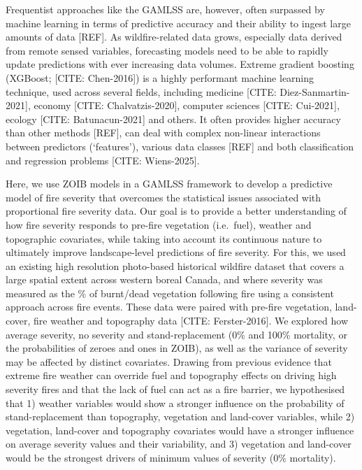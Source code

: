 \documentclass[
  numafflabel,
  authoryear,
  preprint]{elsarticle}
\begin{document}
Frequentist approaches like the GAMLSS are, however, often surpassed by
machine learning in terms of predictive accuracy and their ability to
ingest large amounts of data {[}REF{]}. As wildfire-related data grows,
especially data derived from remote sensed variables, forecasting models
need to be able to rapidly update predictions with ever increasing data
volumes. Extreme gradient boosting (XGBoost; {[}CITE: Chen-2016{]}) is a
highly performant machine learning technique, used across several
fields, including medicine {[}CITE: Diez-Sanmartin-2021{]}, economy
{[}CITE: Chalvatzis-2020{]}, computer sciences {[}CITE: Cui-2021{]},
ecology {[}CITE: Batunacun-2021{]} and others. It often provides higher
accuracy than other methods {[}REF{]}, can deal with complex non-linear
interactions between predictors (`features'), various data classes
{[}REF{]} and both classification and regression problems {[}CITE:
Wiens-2025{]}.

Here, we use ZOIB models in a GAMLSS framework to develop a predictive
model of fire severity that overcomes the statistical issues associated
with proportional fire severity data. Our goal is to provide a better
understanding of how fire severity responds to pre-fire vegetation
(i.e.~fuel), weather and topographic covariates, while taking into
account its continuous nature to ultimately improve landscape-level
predictions of fire severity. For this, we used an existing high
resolution photo-based historical wildfire dataset that covers a large
spatial extent across western boreal Canada, and where severity was
measured as the \% of burnt/dead vegetation following fire using a
consistent approach across fire events. These data were paired with
pre-fire vegetation, land-cover, fire weather and topography data
{[}CITE: Ferster-2016{]}. We explored how average severity, no severity
and stand-replacement (0\% and 100\% mortality, or the probabilities of
zeroes and ones in ZOIB), as well as the variance of severity may be
affected by distinct covariates. Drawing from previous evidence that
extreme fire weather can override fuel and topography effects on driving
high severity fires and that the lack of fuel can act as a fire barrier,
we hypothesised that 1) weather variables would show a stronger
influence on the probability of stand-replacement than topography,
vegetation and land-cover variables, while 2) vegetation, land-cover and
topography covariates would have a stronger influence on average
severity values and their variability, and 3) vegetation and land-cover
would be the strongest drivers of minimum values of severity (0\%
mortality).
\end{document}
